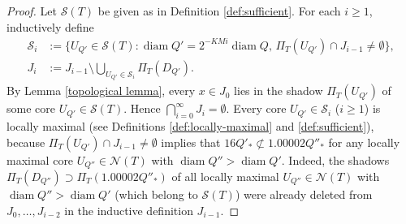 \documentclass[12pt]{amsart}
\numberwithin{equation}{section}
\theoremstyle{plain}
\theoremstyle{definition}
\newcommand{\diam}{\mathop\mathrm{diam}\nolimits}
\numberwithin{figure}{section}
\begin{document}
\begin{proof}
Let $\mathcal{S}(T)$ be given as in Definition \ref{def:sufficient}. For each $i\geq 1$, inductively define \begin{align}\label{next-S} \mathcal{S}_i &:=\{U_{Q'}\in\mathcal{S}(T):\diam Q'=2^{-KMi}\diam Q,\,\Pi_T(U_{Q'})\cap J_{i-1}\neq\emptyset\},\\
J_i&:=J_{i-1}\setminus \bigcup_{U_{Q'}\in\mathcal{S}_i} \Pi_T(D_{Q'}).\end{align} By Lemma \ref{topological lemma}, every $x\in J_0$ lies in the shadow $\Pi_T(U_{Q'})$ of some core $U_{Q'}\in\mathcal{S}(T)$. Hence $\bigcap_{i=0}^\infty J_i=\emptyset$. Every core $U_{Q'}\in\mathcal{S}_i$ ($i\geq 1$) is locally maximal (see Definitions \ref{def:locally-maximal} and \ref{def:sufficient}), because $\Pi_T(U_{Q'})\cap J_{i-1}\neq\emptyset$ implies that $16Q'_*\not\subset 1.00002Q''_*$ for any locally maximal core $U_{Q''}\in\mathcal{N}(T)$ with $\diam Q''>\diam Q'$. Indeed, the shadows $\Pi_T(D_{Q''})\supset \Pi_T(1.00002Q''_*)$ of all locally maximal $U_{Q''}\in\mathcal{N}(T)$ with $\diam Q''>\diam Q'$ (which belong to $\mathcal{S}(T)$) were already deleted from $J_0,\dots, J_{i-2}$ in the inductive definition $J_{i-1}$.


\end{proof}
\end{document}
